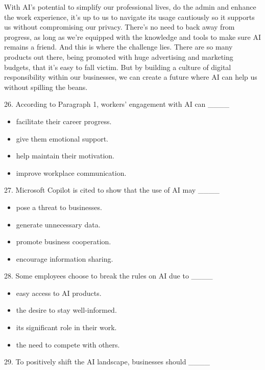 \documentclass[UTF8,11pt]{ctexart}
\begin{document}
With AI’s potential to simplify our professional lives, do the admin and enhance the work experience, it’s up to us to navigate its usage cautiously so it supports us without compromising our privacy. There’s no need to back away from progress, as long as we’re equipped with the knowledge and tools to make sure AI remains a friend. And this is where the challenge lies. There are so many products out there, being promoted with huge advertising and marketing budgets, that it’s easy to fall victim. But by building a culture of digital responsibility within our businesses, we can create a future where AI can help us without spilling the beans.


26. According to Paragraph 1, workers’ engagement with AI can \_\_\_\_


\begin{itemize}[leftmargin=2em,itemsep=.2em,topsep=.4em]\item[A.] facilitate their career progress.
\item[B.] give them emotional support.
\item[C.] help maintain their motivation.
\item[D.] improve workplace communication.
\end{itemize}

27. Microsoft Copilot is cited to show that the use of AI may \_\_\_\_


\begin{itemize}[leftmargin=2em,itemsep=.2em,topsep=.4em]\item[A.] pose a threat to businesses.
\item[B.] generate unnecessary data.
\item[C.] promote business cooperation.
\item[D.] encourage information sharing.
\end{itemize}

28. Some employees choose to break the rules on AI due to \_\_\_\_


\begin{itemize}[leftmargin=2em,itemsep=.2em,topsep=.4em]\item[A.] easy access to AI products.
\item[B.] the desire to stay well-informed.
\item[C.] its significant role in their work.
\item[D.] the need to compete with others.
\end{itemize}

29. To positively shift the AI landscape, businesses should \_\_\_\_
\end{document}
